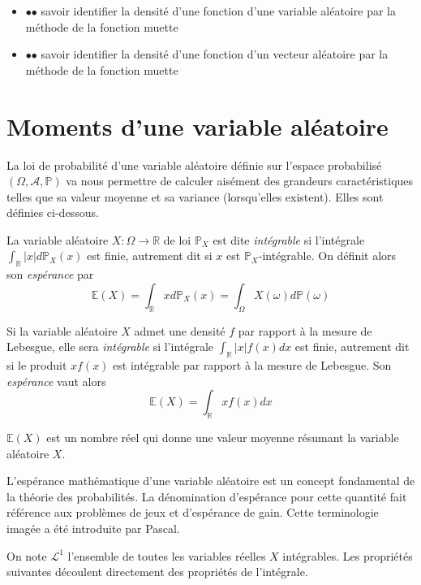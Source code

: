\label{II-identification-de-densituxe9}

\begin{itemize}
\tightlist
\item
  $\mathord{\bullet}\mathord{\bullet}$ savoir identifier la densité
  d'une fonction d'une variable aléatoire par la méthode de la fonction
  muette
\item
  $\mathord{\bullet}\mathord{\bullet}$ savoir identifier la densité
  d'une fonction d'un vecteur aléatoire par la méthode de la fonction
  muette
\end{itemize}

\chapter{Moments d'une variable
aléatoire}\label{II-moments-dune-variable-aluxe9atoire-1}

La loi de probabilité d'une variable aléatoire définie sur l'espace
probabilisé \((\Omega,\mathcal{A},\mathbb{P})\) va nous permettre de
calculer aisément des grandeurs caractéristiques telles que sa valeur
moyenne et sa variance (lorsqu'elles existent). Elles sont définies
ci-dessous.

\begin{definition}\label{II-defesp}

La variable aléatoire \(X : \Omega \to \mathbb{R}\) de loi
\(\mathbb{P}_X\) est dite \emph{intégrable} si l'intégrale
\(\int_\mathbb{R}|x| d\mathbb{P}_X(x)\) est finie, autrement dit si
\(x\) est \(\mathbb{P}_X\)-intégrable. On définit alors son
\emph{espérance} par
\[\mathbb{E}(X) = \int_\mathbb{R}x d\mathbb{P}_X(x) = \int_\Omega X(\omega) d\mathbb{P}(\omega)\]

Si la variable aléatoire \(X\) admet une densité \(f\) par rapport à la
mesure de Lebesgue, elle sera \emph{intégrable} si l'intégrale
\(\int_\mathbb{R}|x|f(x) dx\) est finie, autrement dit si le produit
\(x f(x)\) est intégrable par rapport à la mesure de Lebesgue. Son
\emph{espérance} vaut alors \[\mathbb{E}(X) = \int_\mathbb{R}x f(x)dx\]
\end{definition}

\begin{remarque}[{Interprétation}]\label{II-interpruxe9tation}

\(\mathbb{E}(X)\) est un nombre réel qui donne une valeur moyenne
résumant la variable aléatoire \(X\).

L'espérance mathématique d'une variable aléatoire est un concept
fondamental de la théorie des probabilités. La dénomination d'espérance
pour cette quantité fait référence aux problèmes de jeux et d'espérance
de gain. Cette terminologie imagée a été introduite par Pascal.

On note \(\mathcal{L}^1\) l'ensemble de toutes les variables réelles
\(X\) intégrables. Les propriétés suivantes découlent directement des
propriétés de l'intégrale.
\end{remarque}

